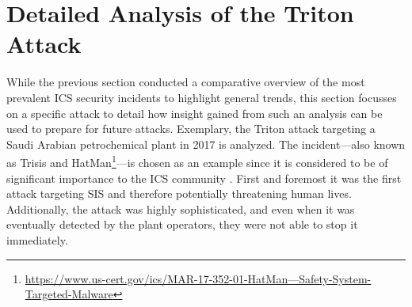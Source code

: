 \documentclass[runningheads]{llncs}
\begin{document}
\section{Detailed Analysis of the Triton Attack}
\label{section:triton}
While the previous section conducted a comparative overview of the most prevalent ICS security incidents to highlight general trends, this section focusses on a specific attack to detail how insight gained from such an analysis can be used to prepare for future attacks.
Exemplary, the Triton attack targeting a Saudi Arabian petrochemical plant in 2017 is analyzed.
The incident---also known as Trisis \cite{dragos.17} and HatMan\footnote{\url{https://www.us-cert.gov/ics/MAR-17-352-01-HatMan—Safety-System-Targeted-Malware}}---is chosen as an example since it is considered to be of significant importance to the ICS community \cite{dragos.17}.
First and foremost it was the first attack targeting SIS and therefore potentially threatening human lives.
Additionally, the attack was highly sophisticated, and even when it was eventually detected by the plant operators, they were not able to stop it immediately.
\end{document}
